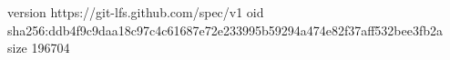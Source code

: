 version https://git-lfs.github.com/spec/v1
oid sha256:ddb4f9c9daa18c97c4c61687e72e233995b59294a474e82f37aff532bee3fb2a
size 196704
